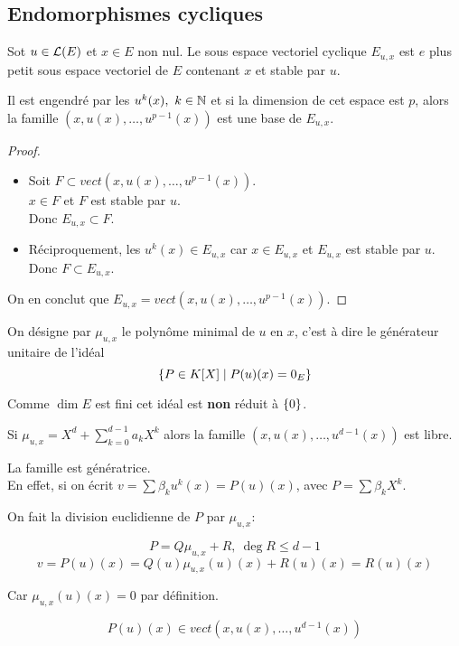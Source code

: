 \subsection{Endomorphismes cycliques}

Sot $u \in \mathcal{L}(E)$ et $x \in E$ non nul.
Le sous espace vectoriel cyclique $E_{u,x}$ est $e$ plus petit sous espace vectoriel de $E$ contenant $x$ et stable par $u$.

Il est engendré par les $u^k(x), \ k \in \mathbb{N}$ et si la dimension de cet espace est $p$, alors la famille
$ (x, u(x), \ldots, u^{p-1}(x))$ est une base de $E_{u,x}$.



\begin{proof}
	\begin{itemize}
		\item
		      Soit $F \subset vect (x, u(x), \ldots, u^{p-1}(x))$.\\
		      $x \in F$ et $F$ est stable par $u$.\\
		      Donc $E_{u,x} \subset F$.

		\item
		      Réciproquement, les $u^k(x) \in E_{u,x}$ car $x \in E_{u,x}$ et $E_{u,x}$ est stable par $u$.
		      Donc $F \subset E_{u,x}$.
	\end{itemize}
	On en conclut que $E_{u,x} = vect (x, u(x), \ldots, u^{p-1}(x))$.
\end{proof}

On désigne par $\mu_{u,x}$ le polynôme minimal de $u$ en $x$, c'est à dire le générateur unitaire de l'idéal
$$ \left\{P \in K[X] \mid P(u)(x) = 0_E\right\}$$

Comme $\dim E$ est fini cet idéal est \textbf{non} réduit à $\left\{0\right\}$.


Si $\mu_{u,x} = X^d + \sum_{k=0}^{d-1} a_k X^k$ alors la famille $(x, u(x), \ldots, u^{d-1}(x))$ est libre.

La famille est génératrice.\\
En effet, si on écrit $v = \sum \beta_k u^k(x) = P(u)(x)$, avec $P = \sum \beta_k X^k$.

On fait la division euclidienne de $P$ par $\mu_{u,x}$:

$$ P = Q \mu_{u,x} + R, \ \deg R \leq d -1$$
$$ v = P(u)(x) = Q(u) \mu_{u,x}(u)(x) + R(u)(x) = R(u)(x)$$

Car $\mu_{u,x}(u)(x) = 0$ par définition.

$$ P(u)(x) \in vect (x, u(x), \ldots, u^{d-1}(x))$$

